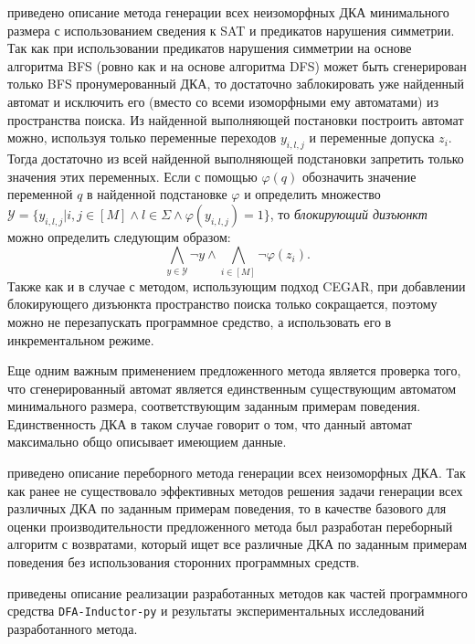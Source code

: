 
\insection{\ref{sec:findall:SAT-based}} приведено описание метода генерации всех неизоморфных ДКА минимального размера с использованием сведения к SAT и предикатов нарушения симметрии.
Так как при использовании предикатов нарушения симметрии на основе алгоритма BFS (ровно как и на основе алгоритма DFS) может быть сгенерирован только BFS пронумерованный ДКА, то достаточно заблокировать уже найденный автомат и исключить его (вместо со всеми изоморфными ему автоматами) из пространства поиска.
Из найденной выполняющей постановки построить автомат можно, используя только переменные переходов $y_{i,l,j}$ и переменные допуска $z_{i}$.
Тогда достаточно из всей найденной выполняющей подстановки запретить только значения этих переменных.
Если с помощью $\varphi\left(q\right)$ обозначить значение переменной $q$ в найденной подстановке $\varphi$ и определить множество $\mathcal{Y} = \{y_{i,l,j} | i,j \in \left[M\right] \wedge l \in \Sigma \wedge \varphi\left(y_{i,l,j}\right) = 1\}$, то \emph{блокирующий дизъюнкт} можно определить следующим образом: $$\bigwedge_{y \in \mathcal{Y}} \neg y \wedge \bigwedge_{i \in \left[M\right]}\neg \varphi\left(z_{i}\right).$$
Также как и в случае с методом, использующим подход CEGAR, при добавлении блокирующего дизъюнкта пространство поиска только сокращается, поэтому можно не перезапускать программное средство, а использовать его в инкрементальном режиме.

Еще одним важным применением предложенного метода является проверка того, что сгенерированный автомат является единственным существующим автоматом минимального размера, соответствующим заданным примерам поведения.
Единственность ДКА в таком случае говорит о том, что данный автомат максимально общо описывает имеющием данные.

\insection{\ref{sec:findall:backtracking}} приведено описание переборного метода генерации всех неизоморфных ДКА. 
Так как ранее не существовало эффективных методов решения задачи генерации всех различных ДКА по заданным примерам поведения, то в качестве базового для оценки производительности предложенного метода был разработан переборный алгоритм с возвратами, который ищет все различные ДКА по заданным примерам поведения без использования сторонних программных средств.

\insection{\ref{sec:findall:results}} приведены описание реализации разработанных методов как частей программного средства \texttt{DFA-Inductor-py} и результаты экспериментальных исследований разработанного метода. 

